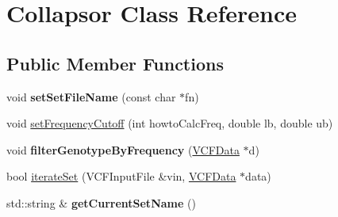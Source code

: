 \hypertarget{classCollapsor}{\section{Collapsor Class Reference}
\label{classCollapsor}
}
\subsection*{Public Member Functions}
\begin{DoxyCompactItemize}
\item 
\hypertarget{classCollapsor_aaa7f3f52d31e81b078933fa34c57d099}{void {\bfseries set\-Set\-File\-Name} (const char $\ast$fn)}\label{classCollapsor_aaa7f3f52d31e81b078933fa34c57d099}

\item 
void \hyperlink{classCollapsor_a4215b29910ad62cb949e8b01eb0ca730}{set\-Frequency\-Cutoff} (int howto\-Calc\-Freq, double lb, double ub)
\item 
\hypertarget{classCollapsor_a833e81ad32307670e9590e921a393716}{void {\bfseries filter\-Genotype\-By\-Frequency} (\hyperlink{classVCFData}{V\-C\-F\-Data} $\ast$d)}\label{classCollapsor_a833e81ad32307670e9590e921a393716}

\item 
bool \hyperlink{classCollapsor_ac89c1d1baaf4932b80e62476e2b667e8}{iterate\-Set} (V\-C\-F\-Input\-File \&vin, \hyperlink{classVCFData}{V\-C\-F\-Data} $\ast$data)
\item 
\hypertarget{classCollapsor_a8c6f764b5b2eae1b5b5aed5b624f74b0}{std\-::string \& {\bfseries get\-Current\-Set\-Name} ()}\label{classCollapsor_a8c6f764b5b2eae1b5b5aed5b624f74b0}

\end{DoxyCompactItemize}


